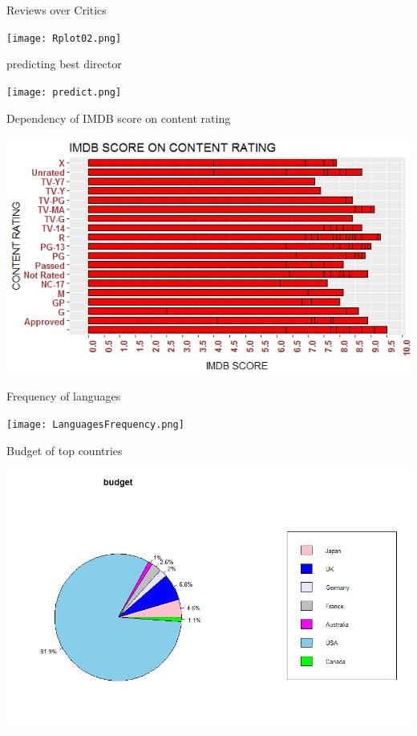 \documentclass[14pt]{beamer}
\begin{document}
\begin{frame}{Reviews over Critics}
  \begin{center}
    \texttt{[image: Rplot02.png]}
  \end{center}
\end{frame}


\begin{frame}{predicting best director}
  \begin{center}
    \texttt{[image: predict.png]}
  \end{center}
\end{frame}

\begin{frame}{Dependency of IMDB score on content rating}
  \begin{center}
    \includegraphics[scale=0.70]{Rplot01.png}
  \end{center}
\end{frame}


\begin{frame}{Frequency of languages}
  \begin{center}
    \texttt{[image: LanguagesFrequency.png]}
  \end{center}
\end{frame}



\begin{frame}{Budget of top countries}
  \begin{center}
    \includegraphics[scale=0.50]{pieBudget.png}
  \end{center}
\end{frame}
\end{document}
